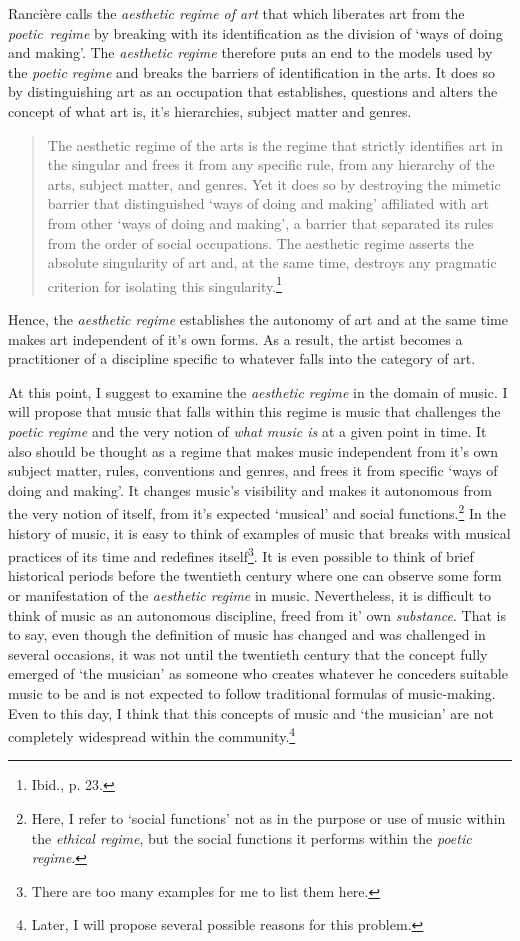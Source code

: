 Ranci\`{e}re calls the \emph{aesthetic regime of art} that which liberates art from the \mbox{\emph{poetic regime}} by breaking with its identification as the division of `ways of doing and making'. The \emph{aesthetic regime} therefore puts an end to the models used by the \emph{poetic regime} and breaks the barriers of identification in the arts. It does so by distinguishing art as an occupation that establishes, questions and alters the concept of what art is, it's hierarchies, subject matter and genres. 
\begin{quote}
The aesthetic regime of the arts is the regime that strictly identifies art in the singular and frees it from any specific rule, from any hierarchy of the arts, subject matter, and genres. Yet it does so by destroying the mimetic barrier that distinguished `ways of doing and making' affiliated with art from other `ways of doing and making', a barrier that separated its rules from the order of social occupations. The aesthetic regime asserts the absolute singularity of art and, at the same time, destroys any pragmatic criterion for isolating this singularity.\footnote{Ibid., p. 23.}
\end{quote}
Hence, the \emph{aesthetic regime} establishes the autonomy of art and at the same time makes art independent of it's own forms. As a result, the artist becomes a practitioner of a discipline specific to whatever falls into the category of art. 

At this point, I suggest to examine the \emph{aesthetic regime} in the domain of music. I will propose that music that falls within this regime is music that challenges the \emph{poetic regime} and the very notion of \emph{what music is} at a given point in time. It also should be thought as a regime that makes music independent from it's own subject matter, rules, conventions and genres, and frees it from specific `ways of doing and making'. It changes music's visibility and makes it autonomous from the very notion of itself, from it's expected `musical' and social functions.\footnote{Here, I refer to `social functions' not as in the purpose or use of music within the \emph{ethical regime}, but the social functions it performs within the \emph{poetic regime}.} In the history of music, it is easy to think of examples of music that breaks with musical practices of its time and redefines itself\footnote{There are too many examples for me to list them here.}. It is even possible to think of brief historical periods before the twentieth century where one can observe some form or manifestation of the \emph{aesthetic regime} in music. Nevertheless, it is difficult to think of music as an autonomous discipline, freed from it' own \emph{substance}. That is to say, even though the definition of music has changed and was challenged in several occasions, it was not until the twentieth century that the concept fully emerged of `the musician' as someone who creates whatever he conceders suitable music to be and is not expected to follow traditional formulas of music-making. Even to this day, I think that this concepts of music and `the musician' are not completely widespread within the community.\footnote{Later, I will propose several possible reasons for this problem.}

